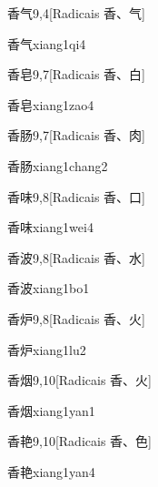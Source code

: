 \begin{entry}{香气}{9,4}[Radicais ⾹、⽓]
  \begin{phonetics}{香气}{xiang1qi4}
  \end{phonetics}
\end{entry}

\begin{entry}{香皂}{9,7}[Radicais ⾹、⽩]
  \begin{phonetics}{香皂}{xiang1zao4}
  \end{phonetics}
\end{entry}

\begin{entry}{香肠}{9,7}[Radicais ⾹、⾁]
  \begin{phonetics}{香肠}{xiang1chang2}
  \end{phonetics}
\end{entry}

\begin{entry}{香味}{9,8}[Radicais ⾹、⼝]
  \begin{phonetics}{香味}{xiang1wei4}
  \end{phonetics}
\end{entry}

\begin{entry}{香波}{9,8}[Radicais ⾹、⽔]
  \begin{phonetics}{香波}{xiang1bo1}
  \end{phonetics}
\end{entry}

\begin{entry}{香炉}{9,8}[Radicais ⾹、⽕]
  \begin{phonetics}{香炉}{xiang1lu2}
  \end{phonetics}
\end{entry}

\begin{entry}{香烟}{9,10}[Radicais ⾹、⽕]
  \begin{phonetics}{香烟}{xiang1yan1}
  \end{phonetics}
\end{entry}

\begin{entry}{香艳}{9,10}[Radicais ⾹、⾊]
  \begin{phonetics}{香艳}{xiang1yan4}
  \end{phonetics}
\end{entry}

